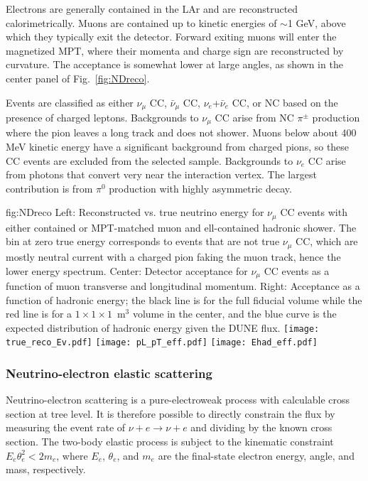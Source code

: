 Electrons are generally contained in the LAr and are reconstructed calorimetrically. Muons are contained up to kinetic energies of $\sim$1 GeV, above which they typically exit the detector. Forward exiting muons will enter the magnetized MPT, where their momenta and charge sign are reconstructed by curvature. The acceptance is somewhat lower at large angles, as shown in the center panel of Fig.~\ref{fig:NDreco}.

Events are classified as either $\nu_{\mu}$ CC, $\bar{\nu}_{\mu}$ CC, $\nu_{e}$+$\bar{\nu}_{e}$ CC, or NC based on the presence of charged leptons. Backgrounds to $\nu_{\mu}$ CC arise from NC $\pi^{\pm}$ production where the pion leaves a long track and does not shower. Muons below about 400 MeV kinetic energy have a significant background from charged pions, so these CC events are excluded from the selected sample. Backgrounds to $\nu_{e}$ CC arise from photons that convert very near the interaction vertex. The largest contribution is from $\pi^{0}$ production with highly asymmetric decay.

\begin{dunefigure}[ND reconstruction]{fig:NDreco}
{Left: Reconstructed vs. true neutrino energy for $\nu_{\mu}$ CC events with either contained or MPT-matched muon and ell-contained hadronic shower. The bin at zero true energy corresponds to events that are not true $\nu_{\mu}$ CC, which are mostly neutral current with a charged pion faking the muon track, hence the lower energy spectrum. Center: Detector acceptance for $\nu_{\mu}$ CC events as a function of muon transverse and longitudinal momentum. Right: Acceptance as a function of hadronic energy; the black line is for the full fiducial volume while the red line is for a $1 \times 1 \times 1$~m$^{3}$ volume in the center, and the blue curve is the expected distribution of hadronic energy given the DUNE flux.}
 \texttt{[image: true\_reco\_Ev.pdf]}
 \texttt{[image: pL\_pT\_eff.pdf]}
 \texttt{[image: Ehad\_eff.pdf]}
\end{dunefigure}

\subsubsection{Neutrino-electron elastic scattering}

Neutrino-electron scattering is a pure-electroweak process with calculable cross section at tree level. It is therefore possible to directly constrain the flux by measuring the event rate of $\nu+ e \rightarrow \nu +e$ and dividing by the known cross section. The two-body elastic process is subject to the kinematic constraint $E_{e}\theta_{e}^{2} < 2m_{e}$, where $E_{e}$, $\theta_{e}$, and $m_{e}$ are the final-state electron energy, angle, and mass, respectively.

